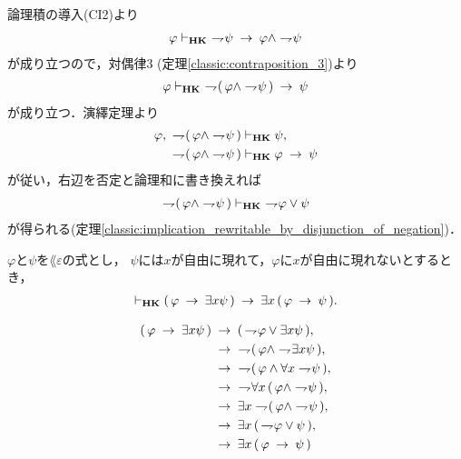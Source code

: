 	\begin{sketch}
		論理積の導入(CI2)より
		\begin{align}
			\varphi \vdash_{{\scriptsize \mbox{{\bf HK}}}}\ \rightharpoondown\hspace{-0.25em} \psi
			\hspace{0.25em}\rightarrow\hspace{0.25em} \varphi \wedge \rightharpoondown\hspace{-0.25em} \psi
		\end{align}
		が成り立つので，対偶律3 (定理\ref{classic:contraposition_3})より
		\begin{align}
			\varphi \provable{\mbox{{\bf HK}}}\ 
			\negation (\, \varphi \wedge \negation \psi\, ) \rarrow \psi
		\end{align}
		が成り立つ．演繹定理より
		\begin{align}
			\varphi,\ \rightharpoondown\hspace{-0.25em} (\, \varphi \wedge \rightharpoondown\hspace{-0.25em} \psi\, ) 
			&\vdash_{{\scriptsize \mbox{{\bf HK}}}} \psi, \\
			\rightharpoondown\hspace{-0.25em} (\, \varphi \wedge \rightharpoondown\hspace{-0.25em} \psi\, ) 
			&\vdash_{{\scriptsize \mbox{{\bf HK}}}} \varphi \hspace{0.25em}\rightarrow\hspace{0.25em} \psi
		\end{align}
		が従い，右辺を否定と論理和に書き換えれば
		\begin{align}
			\rightharpoondown\hspace{-0.25em} (\, \varphi \wedge \rightharpoondown\hspace{-0.25em} \psi\, ) 
			\vdash_{{\scriptsize \mbox{{\bf HK}}}}\ \rightharpoondown\hspace{-0.25em} \varphi \vee \psi
		\end{align}
		が得られる(定理\ref{classic:implication_rewritable_by_disjunction_of_negation})．
		\QED
	\end{sketch}
	
	\begin{screen}
		\begin{thm}
			$\varphi$と$\psi$を$\lang{\varepsilon}$の式とし，
			$\psi$には$x$が自由に現れて，$\varphi$に$x$が自由に現れないとするとき，
			\begin{align}
				\vdash_{{\scriptsize \mbox{{\bf HK}}}} (\, \varphi \hspace{0.25em}\rightarrow\hspace{0.25em} \exists x \psi\, )
				\hspace{0.25em}\rightarrow\hspace{0.25em} \exists x\, (\, \varphi \hspace{0.25em}\rightarrow\hspace{0.25em} \psi\, ).
			\end{align}
		\end{thm}
	\end{screen}
	
	\begin{sketch}
		\begin{align}
			(\, \varphi \rarrow \exists x \psi\, ) &\rarrow 
				(\, \negation \varphi \vee \exists x \psi\, ), \\
			&\rarrow\ \negation (\, \varphi \wedge \negation \exists x \psi\, ), \\
			&\rarrow\ \negation (\, \varphi \wedge \forall x \negation \psi\, ), \\
			&\rarrow\ \negation \forall x\, (\, \varphi \wedge \negation \psi\, ), \\
			&\rarrow \exists x \negation (\, \varphi \wedge \negation \psi\, ), \\
			&\rarrow \exists x\, (\, \negation \varphi \vee \psi\, ), \\
			&\rarrow \exists x\, (\, \varphi \rarrow \psi\, )
		\end{align}
	\end{sketch}
	
